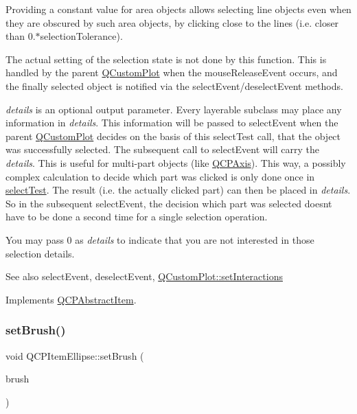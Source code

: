 Providing a constant value for area objects allows selecting line objects even when they are obscured by such area objects, by clicking close to the lines (i.\+e. closer than 0.$\ast$selection\+Tolerance).

The actual setting of the selection state is not done by this function. This is handled by the parent \mbox{\hyperlink{class_q_custom_plot}{Q\+Custom\+Plot}} when the mouse\+Release\+Event occurs, and the finally selected object is notified via the select\+Event/deselect\+Event methods.

{\itshape details} is an optional output parameter. Every layerable subclass may place any information in {\itshape details}. This information will be passed to select\+Event when the parent \mbox{\hyperlink{class_q_custom_plot}{Q\+Custom\+Plot}} decides on the basis of this select\+Test call, that the object was successfully selected. The subsequent call to select\+Event will carry the {\itshape details}. This is useful for multi-\/part objects (like \mbox{\hyperlink{class_q_c_p_axis}{Q\+C\+P\+Axis}}). This way, a possibly complex calculation to decide which part was clicked is only done once in \mbox{\hyperlink{class_q_c_p_item_ellipse_aa41be2180b2ace2e303b88d005c14243}{select\+Test}}. The result (i.\+e. the actually clicked part) can then be placed in {\itshape details}. So in the subsequent select\+Event, the decision which part was selected doesn\textquotesingle{}t have to be done a second time for a single selection operation.

You may pass 0 as {\itshape details} to indicate that you are not interested in those selection details.

\begin{DoxySeeAlso}{See also}
select\+Event, deselect\+Event, \mbox{\hyperlink{class_q_custom_plot_a5ee1e2f6ae27419deca53e75907c27e5}{Q\+Custom\+Plot\+::set\+Interactions}} 
\end{DoxySeeAlso}


Implements \mbox{\hyperlink{class_q_c_p_abstract_item_a96d522d10ffc0413b9a366c6f7f0476b}{Q\+C\+P\+Abstract\+Item}}.

\mbox{\label{class_q_c_p_item_ellipse_a49fc74e6965834e873d027d026def798}} 
\subsubsection{\texorpdfstring{set\+Brush()}{setBrush()}}
{\footnotesize\ttfamily void Q\+C\+P\+Item\+Ellipse\+::set\+Brush (\begin{DoxyParamCaption}\item[{const Q\+Brush \&}]{brush }\end{DoxyParamCaption})}

